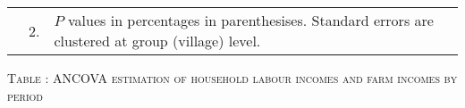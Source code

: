 \begin{minipage}[t]{14cm}
\begin{tabular}{>{\hfill\scriptsize}p{1cm}<{}>{\hfill\scriptsize}p{.25cm}<{}>{\scriptsize}p{12cm}<{\hfill}}
& 2. & $P$ values in percentages in parenthesises. Standard errors are clustered at group (village) level.
\end{tabular}
\end{minipage}

\hspace{-1cm}\begin{minipage}[t]{14cm}
\hfil\textsc{\normalsize Table \thetable: ANCOVA estimation of household labour incomes and farm incomes by period\label{tab ANCOVA labour incomes timevarying}}\\
\setlength{\tabcolsep}{1pt}
\setlength{\baselineskip}{8pt}
\renewcommand{\arraystretch}{.55}


\end{minipage}
